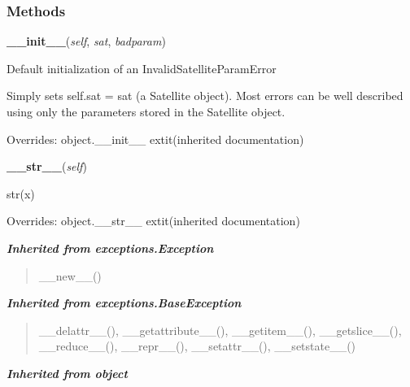   \subsubsection{Methods}

    \vspace{0.5ex}

\hspace{.8\funcindent}\begin{boxedminipage}{\funcwidth}

    \raggedright \textbf{\_\_init\_\_}(\textit{self}, \textit{sat}, \textit{badparam})

\setlength{\parskip}{2ex}
    Default initialization of an InvalidSatelliteParamError

    Simply sets self.sat = sat (a Satellite object).  Most errors can be 
    well described using only the parameters stored in the Satellite 
    object.

\setlength{\parskip}{1ex}
      Overrides: object.\_\_init\_\_ 	extit{(inherited documentation)}

    \end{boxedminipage}

    \vspace{0.5ex}

\hspace{.8\funcindent}\begin{boxedminipage}{\funcwidth}

    \raggedright \textbf{\_\_str\_\_}(\textit{self})

\setlength{\parskip}{2ex}
    str(x)

\setlength{\parskip}{1ex}
      Overrides: object.\_\_str\_\_ 	extit{(inherited documentation)}

    \end{boxedminipage}


\large{\textbf{\textit{Inherited from exceptions.Exception}}}

\begin{quote}
\_\_new\_\_()
\end{quote}

\large{\textbf{\textit{Inherited from exceptions.BaseException}}}

\begin{quote}
\_\_delattr\_\_(), \_\_getattribute\_\_(), \_\_getitem\_\_(), \_\_getslice\_\_(), \_\_reduce\_\_(), \_\_repr\_\_(), \_\_setattr\_\_(), \_\_setstate\_\_()
\end{quote}

\large{\textbf{\textit{Inherited from object}}}

